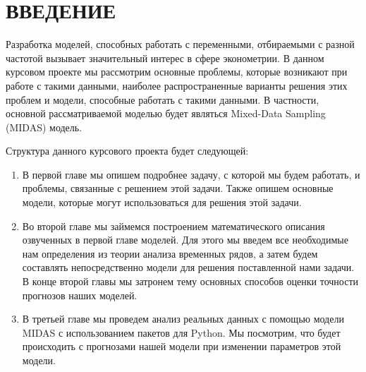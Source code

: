 \documentclass[a4paper, 12pt]{extarticle}
\begin{document}
	\section{ВВЕДЕНИЕ}
	Разработка моделей, способных работать с переменными, отбираемыми с разной частотой вызывает значительный интерес в сфере эконометрии. В данном курсовом проекте мы рассмотрим основные проблемы, которые возникают при работе с такими данными, наиболее распространенные варианты решения этих проблем и модели, способные работать с такими данными. В частности, основной рассматриваемой моделью будет являться Mixed-Data Sampling (MIDAS) модель.
	
	Структура данного курсового проекта будет следующей:
	\begin{enumerate}
		\item В первой главе мы опишем подробнее задачу, с которой мы будем работать, и проблемы, связанные с решением этой задачи. Также опишем основные модели, которые могут использоваться для решения этой задачи.
		\item Во второй главе мы займемся построением математического описания озвученных в первой главе моделей. Для этого мы введем все необходимые нам определения из теории анализа временных рядов, а затем будем составлять непосредственно модели для решения поставленной нами задачи. В конце второй главы мы затронем тему основных способов оценки точности прогнозов наших моделей.
		\item В третьей главе мы проведем анализ реальных данных с помощью модели MIDAS с использованием пакетов для Python. Мы посмотрим, что будет происходить с прогнозами нашей модели при изменении параметров этой модели.
	\end{enumerate}
	
	  
	\newpage
\end{document}
